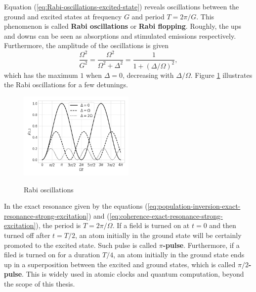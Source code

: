 Equation (\ref{eq:Rabi-oscillations-excited-state}) reveals oscillations between the ground and excited states at frequency $ G $ and period $ T = 2\pi / G $. This phenomenon is called \textbf{Rabi oscillations} or \textbf{Rabi flopping}. Roughly, the ups and downs can be seen as absorptions and stimulated emissions respectively. Furthermore, the amplitude of the oscillations is given
\begin{equation}
	\frac{\Omega^2}{G^2} = \frac{\Omega^2}{\Omega^2 + \Delta^2} = \frac{1}{1 + (\Delta / \Omega)^2},
\end{equation}
which has the maximum $ 1 $ when $ \Delta = 0 $, decreasing with $ \Delta / \Omega $. Figure \ref{fig:Rabi-oscillations} illustrates the Rabi oscillations for a few detunings.

\begin{figure}[!ht]
	\centering
	\caption{Rabi oscillations}
	\vspace{-10pt}
	\includegraphics[width=0.5\textwidth]{USPSC-img/Rabi_oscillations.png}
	\label{fig:Rabi-oscillations}
	\vspace{-15pt}
\end{figure}

In the exact resonance given by the equations (\ref{eq:population-inversion-exact-resonance-strong-excitation}) and (\ref{eq:coherence-exact-resonance-strong-excitation}), the period is $ T = 2\pi / \Omega $. If a field is turned on at $ t = 0 $ and then turned off after $ t = T / 2 $, an atom initially in the ground state will be certainly promoted to the excited state. Such pulse is called \textbf{$\pi$-pulse}. Furthermore, if a filed is turned on for a duration $ T / 4 $, an atom initially in the ground state ends up in a superposition between the excited and ground states, which is called \textbf{$\pi/2$-pulse}. This is widely used in atomic clocks and quantum computation, beyond the scope of this thesis.

